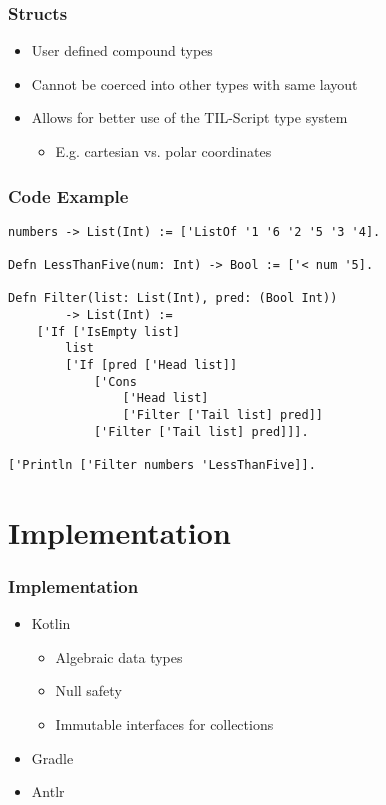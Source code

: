\documentclass{beamer}
\begin{document}
\begin{frame}
    \frametitle{Structs}
    \begin{itemize}
        \item User defined compound types
        \item Cannot be coerced into other types with same layout
        \item Allows for better use of the TIL-Script type system
            \begin{itemize}
                \item E.g. cartesian vs. polar coordinates
            \end{itemize}
    \end{itemize}
\end{frame}

\begin{frame}[fragile]
\frametitle{Code Example}
    
\begin{lstlisting}[basicstyle=\small]
numbers -> List(Int) := ['ListOf '1 '6 '2 '5 '3 '4].

Defn LessThanFive(num: Int) -> Bool := ['< num '5].

Defn Filter(list: List(Int), pred: (Bool Int))
        -> List(Int) :=
    ['If ['IsEmpty list]
        list
        ['If [pred ['Head list]]
            ['Cons 
                ['Head list] 
                ['Filter ['Tail list] pred]]
            ['Filter ['Tail list] pred]]].

['Println ['Filter numbers 'LessThanFive]].
\end{lstlisting}

\end{frame}

\section{Implementation}

\begin{frame}
    \frametitle{Implementation}
    \begin{itemize}
        \item Kotlin
            \begin{itemize}
                \item Algebraic data types
                \item Null safety
                \item Immutable interfaces for collections
            \end{itemize}
        \item Gradle
        \item Antlr
    \end{itemize}
\end{frame}
\end{document}
